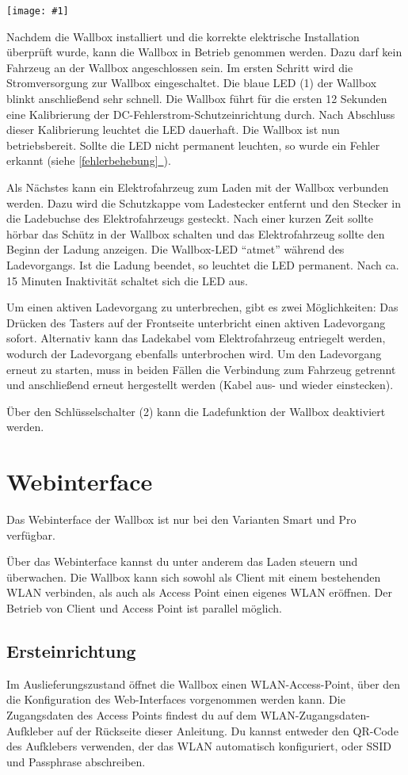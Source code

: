 \documentclass[a4paper,10pt]{article}
\newcommand{\gfx}[1]{\texttt{[image: \#1]}}
\newcommand*{\fullref}[1]{\hyperref[{#1}]{\ref*{#1}~\nameref*{#1}}}
\begin{document}
\begin{multicols*}{2}
	\gfx{./img/resized/warp_button_key_ready}

	Nachdem die Wallbox installiert
	und die korrekte elektrische Installation überprüft wurde, kann die Wallbox in
	Betrieb genommen werden. Dazu darf kein Fahrzeug an der Wallbox angeschlossen
	sein. Im ersten Schritt wird die Stromversorgung zur Wallbox eingeschaltet. Die
	blaue LED (1) der Wallbox blinkt anschließend sehr schnell. Die Wallbox führt
	für die ersten 12 Sekunden eine Kalibrierung der
	DC-Fehlerstrom-Schutzeinrichtung durch. Nach Abschluss dieser Kalibrierung
	leuchtet die LED dauerhaft. Die Wallbox ist nun betriebsbereit. Sollte die LED
	nicht permanent leuchten, so wurde ein Fehler erkannt (siehe
	\fullref{fehlerbehebung}).

	Als Nächstes kann ein Elektrofahrzeug zum Laden mit der Wallbox verbunden
	werden. Dazu wird die Schutzkappe vom Ladestecker entfernt und den Stecker in die
	Ladebuchse des Elektrofahrzeugs gesteckt. Nach einer kurzen Zeit sollte hörbar
	das Schütz in der Wallbox schalten und das Elektrofahrzeug sollte den Beginn
	der Ladung anzeigen. Die Wallbox-LED \enquote{atmet} während des
	Ladevorgangs. Ist die Ladung beendet, so leuchtet die LED permanent. Nach ca.
	15 Minuten Inaktivität schaltet sich die LED aus.

	Um einen aktiven Ladevorgang zu unterbrechen, gibt es zwei Möglichkeiten: Das
	Drücken des Tasters auf der Frontseite unterbricht einen aktiven Ladevorgang
	sofort. Alternativ kann das Ladekabel vom Elektrofahrzeug entriegelt werden,
	wodurch der Ladevorgang ebenfalls unterbrochen wird. Um den Ladevorgang erneut
	zu starten, muss in beiden Fällen die Verbindung zum Fahrzeug getrennt und
	anschließend erneut hergestellt werden (Kabel aus- und wieder einstecken).

	Über den Schlüsselschalter (2) kann die Ladefunktion der Wallbox deaktiviert
	werden.

	\section{Webinterface}
	Das Webinterface der Wallbox ist nur bei den Varianten Smart und Pro verfügbar.

	Über das Webinterface kannst du unter anderem das Laden steuern und überwachen.
	Die Wallbox kann sich sowohl als Client mit einem bestehenden WLAN verbinden,
	als auch als Access Point einen eigenes WLAN eröffnen. Der Betrieb von Client
	und Access Point ist parallel möglich.

	\subsection{Ersteinrichtung}
	Im Auslieferungszustand öffnet die Wallbox einen WLAN-Access-Point, über den
	die Konfiguration des Web-Interfaces vorgenommen werden kann.
	Die Zugangsdaten des Access Points findest du auf dem WLAN-Zugangsdaten-Aufkleber
	auf der Rückseite dieser Anleitung. Du kannst entweder den QR-Code des Aufklebers verwenden,
	der das WLAN automatisch konfiguriert, oder SSID und Passphrase abschreiben.


\end{multicols*}
\end{document}
